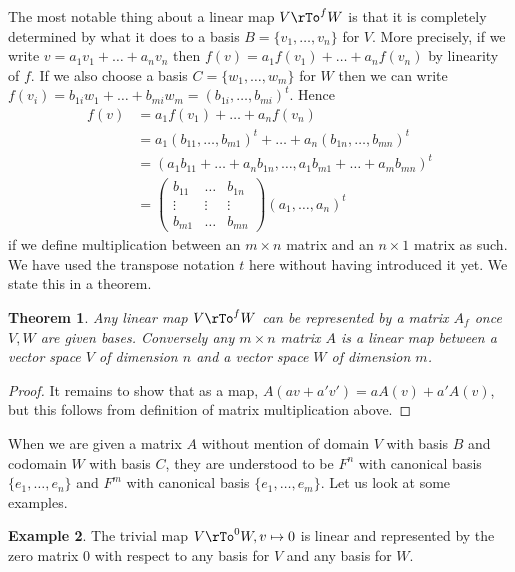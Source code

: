 \documentclass[12pt]{amsart}
\newtheorem{theorem}{Theorem}[section]
\theoremstyle{definition}
\newtheorem{example}[theorem]{Example}
\begin{document}
The most notable thing about a linear map $V \rTo^{f} W$ is that it is completely determined by what it does to a basis $B = \{v_1, \dots, v_n\}$ for $V$. More precisely, if we write $v = a_1 v_1 + \ldots + a_n v_n$ then $f(v) = a_1 f(v_1) + \ldots + a_n f(v_n)$ by linearity of $f$. If we also choose a basis $C = \{w_1, \dots, w_m\}$ for $W$ then we can write $f(v_i) = b_{1i} w_1 + \ldots + b_{mi}w_m = (b_{1i}, \dots, b_{mi})^t$. Hence
\begin{align*}
f(v) & = a_1 f(v_1) + \ldots + a_n f(v_n) \\
 & = a_1 (b_{11}, \dots, b_{m1})^t + \ldots + a_n(b_{1n}, \dots, b_{mn})^t \\
 & = (a_1 b_{11} + \ldots + a_n b_{1n}, \dots, a_1 b_{m1} + \ldots + a_m b_{mn})^t \\
 & = \left( \begin{array}{ccc} b_{11} & \dots & b_{1n} \\ \vdots & \vdots & \vdots \\ b_{m1} & \dots & b_{mn} \end{array} \right) (a_1, \dots, a_n)^t
\end{align*}
if we define multiplication between an $m \times n$ matrix and an $n \times 1$ matrix as such. We have used the transpose notation $t$ here without having introduced it yet. We state this in a theorem.

\begin{theorem} Any linear map $V \rTo^f W$ can be represented by a matrix $A_f$ once $V, W$ are given bases. Conversely any $m \times n$ matrix $A$ is a linear map between a vector space $V$ of dimension $n$  and a vector space $W$ of dimension $m$.
\end{theorem}
\begin{proof} It remains to show that as a map, $A(a v + a' v') = a A(v) + a' A(v)$, but this follows from definition of matrix multiplication above.
\end{proof}

When we are given a matrix $A$ without mention of domain $V$ with basis $B$ and codomain $W$ with basis $C$,  they are understood to be $F^n$ with canonical basis $\{e_1, \dots, e_n\}$ and $F^m$ with canonical basis $\{e_1, \dots, e_m\}$. Let us look at some examples.

\begin{example} The trivial map $V \rTo^0 W, v \mapsto 0$ is linear and represented by the zero matrix 0 with respect to any basis for $V$ and any basis for $W$.
\end{example}
\end{document}
